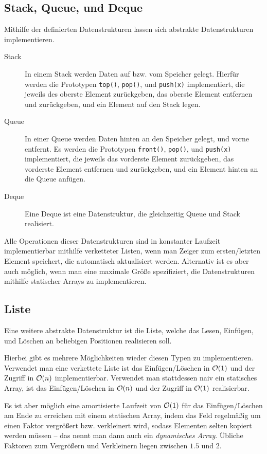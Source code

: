 \subsection{Stack, Queue, und Deque}
Mithilfe der definierten Datenstrukturen lassen sich abstrakte Datenstrukturen implementieren.
\begin{description}
    \item[Stack] In einem Stack werden Daten auf bzw. vom Speicher gelegt.
        Hierfür werden die Prototypen \lstinline|top()|, \lstinline|pop()|, und \lstinline|push(x)| implementiert, die jeweils des oberste Element zurückgeben, das oberste Element entfernen und zurückgeben, und ein Element auf den Stack legen.

    \item[Queue] In einer Queue werden Daten hinten an den Speicher gelegt, und vorne entfernt.
        Es werden die Prototypen \lstinline|front()|, \lstinline|pop()|, und \lstinline|push(x)| implementiert, die jeweils das vorderste Element zurückgeben, das vorderste Element entfernen und zurückgeben, und ein Element hinten an die Queue anfügen.

    \item[Deque] Eine Deque ist eine Datenstruktur, die gleichzeitig Queue und Stack realisiert.
\end{description}

\pagebreak

Alle Operationen dieser Datenstrukturen sind in konstanter Laufzeit implementierbar mithilfe verketteter Listen, wenn man Zeiger zum ersten/letzten Element speichert, die automatisch aktualisiert werden.
Alternativ ist es aber auch möglich, wenn man eine maximale Größe spezifiziert, die Datenstrukturen mithilfe statischer Arrays zu implementieren.

\subsection{Liste}
Eine weitere abstrakte Datenstruktur ist die Liste, welche das Lesen, Einfügen, und Löschen an beliebigen Positionen realisieren soll.

Hierbei gibt es mehrere Möglichkeiten wieder diesen Typen zu implementieren.
Verwendet man eine verkettete Liste ist das Einfügen/Löschen in \(\mathcal O(1)\) und der Zugriff in \(\mathcal O(n)\) implementierbar.
Verwendet man stattdessen naiv ein statisches Array, ist das Einfügen/Löschen in \(\mathcal O(n)\) und der Zugriff in \(\mathcal O(1)\) realisierbar.

Es ist aber möglich eine amortisierte Laufzeit von \(\mathcal O(1)\) für das Einfügen/Löschen am Ende zu erreichen mit einem statischen Array, indem das Feld regelmäßig um einen Faktor vergrößert bzw. verkleinert wird, sodass Elementen selten kopiert werden müssen -- das nennt man dann auch ein \emph{dynamisches Array}.
Übliche Faktoren zum Vergrößern und Verkleinern liegen zwischen \(1.5\) und \(2\).

